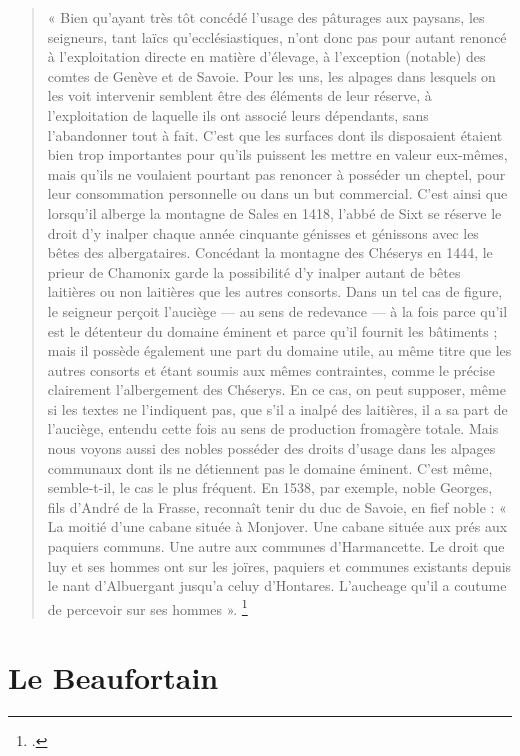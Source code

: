 \documentclass[12pt,a4paper]{report}
\begin{document}
		\begin{quote}
		« Bien qu’ayant très tôt concédé l’usage des pâturages aux paysans, les seigneurs, tant laïcs qu’ecclésiastiques, n’ont donc pas pour autant renoncé à l’exploitation directe en matière d’élevage, à l’exception (notable) des comtes de Genève et de Savoie. Pour les uns, les alpages dans lesquels on les voit intervenir semblent être des éléments de leur réserve, à l’exploitation de laquelle ils ont associé leurs dépendants, sans l’abandonner tout à fait. C’est que les surfaces dont ils disposaient étaient bien trop importantes pour qu’ils puissent les mettre en valeur eux-mêmes, mais qu’ils ne voulaient pourtant pas renoncer à posséder un cheptel, pour leur consommation personnelle ou dans un but commercial. C’est ainsi que lorsqu’il alberge la montagne de Sales en 1418, l’abbé de Sixt se réserve le droit d’y inalper chaque année cinquante génisses et génissons avec les bêtes des albergataires. Concédant la montagne des Chéserys en 1444, le prieur de Chamonix garde la possibilité d’y inalper autant de bêtes laitières ou non laitières que les autres consorts. Dans un tel cas de figure, le seigneur perçoit l’auciège — au sens de redevance — à la fois parce qu’il est le détenteur du domaine éminent et parce qu’il fournit les bâtiments ; mais il possède également une part du domaine utile, au même titre que les autres consorts et étant soumis aux mêmes contraintes, comme le précise clairement l’albergement des Chéserys. En ce cas, on peut supposer, même si les textes ne l’indiquent pas, que s’il a inalpé des laitières, il a sa part de l’auciège, entendu cette fois au sens de production fromagère totale. Mais nous voyons aussi des nobles posséder des droits d’usage dans les alpages communaux dont ils ne détiennent pas le domaine éminent. C’est même, semble-t-il, le cas le plus fréquent. En 1538, par exemple, noble Georges, fils d’André de la Frasse, reconnaît tenir du duc de Savoie, en fief noble : « La moitié d’une cabane située à Monjover. Une cabane située aux prés aux paquiers communs. Une autre aux communes d’Harmancette. Le droit que luy et ses hommes ont sur les joïres, paquiers et communes existants depuis le nant d’Albuergant jusqu’a celuy d’Hontares. L’aucheage qu’il a coutume de percevoir sur ses hommes ». \footcite[344--345]{Carrier2001VieMontagnardeFaucigny}
	\end{quote}	
	
	

	
\chapter{Le Beaufortain}
\end{document}
